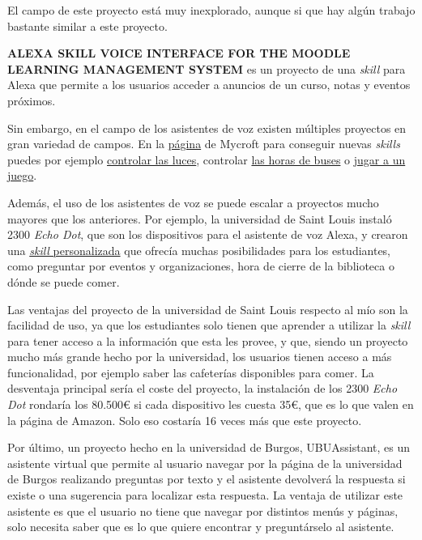 
El campo de este proyecto está muy inexplorado, aunque si que hay algún trabajo bastante similar a este proyecto.

\textbf{ALEXA SKILL VOICE INTERFACE FOR THE MOODLE LEARNING MANAGEMENT SYSTEM}\cite{meltonALEXASKILLVOICE} es un proyecto de una \textit{skill} para Alexa que permite a los usuarios acceder a anuncios de un curso, notas y eventos próximos.

Sin embargo, en el campo de los asistentes de voz existen múltiples proyectos en gran variedad de campos. En la \href{https://market.mycroft.ai/skills}{página} de Mycroft para conseguir nuevas \textit{skills} puedes por ejemplo \href{https://market.mycroft.ai/skills/3422768c-8f3a-45c4-ad47-a86b9eba6a02}{controlar las luces}, controlar \href{https://market.mycroft.ai/skills/b213f51b-c8aa-455e-80ec-f2489cf20eca}{las horas de buses} o \href{https://market.mycroft.ai/skills/5cff8320-4738-4e06-ac87-a5c3e6af5c25}{jugar a un juego}.

Además, el uso de los asistentes de voz se puede escalar a proyectos mucho mayores que los anteriores. Por ejemplo, la universidad de Saint Louis instaló 2300 \textit{Echo Dot}\cite{SLUAlexaProject}, que son los dispositivos para el asistente de voz Alexa, y crearon una \href{https://www.amazon.com/Saint-Louis-University-Ask/dp/B07YDNW9RN}{\textit{skill} personalizada} que ofrecía muchas posibilidades para los estudiantes, como preguntar por eventos y organizaciones, hora de cierre de la biblioteca o dónde se puede comer.

Las ventajas del proyecto de la universidad de Saint Louis respecto al mío son la facilidad de uso, ya que los estudiantes solo tienen que aprender a utilizar la \textit{skill} para tener acceso a la información que esta les provee, y que, siendo un proyecto mucho más grande hecho por la universidad, los usuarios tienen acceso a más funcionalidad, por ejemplo saber las cafeterías disponibles para comer. La desventaja principal sería el coste del proyecto, la instalación de los 2300 \textit{Echo Dot} rondaría los 80.500€ si cada dispositivo les cuesta 35€, que es lo que valen en la página de Amazon. Solo eso costaría 16 veces más que este proyecto.

Por último, un proyecto hecho en la universidad de Burgos, UBUAssistant\cite{DanielSantidrianUBUassistant}, es un asistente virtual que permite al usuario navegar por la página de la universidad de Burgos realizando preguntas por texto y el asistente devolverá la respuesta si existe o una sugerencia para localizar esta respuesta. La ventaja de utilizar este asistente es que el usuario no tiene que navegar por distintos menús y páginas, solo necesita saber que es lo que quiere encontrar y preguntárselo al asistente.